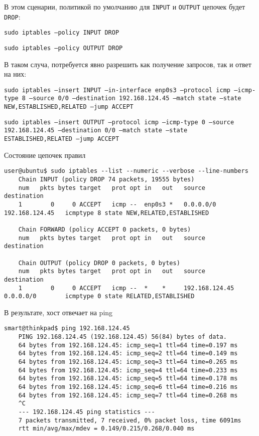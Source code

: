 В этом сценарии, политикой по умолчанию для \texttt{INPUT} и \texttt{OUTPUT} цепочек будет \texttt{DROP}:

\texttt{sudo iptables --policy INPUT DROP}

\texttt{sudo iptables --policy OUTPUT DROP}

В таком случа, потребуется явно разрешить как получение запросов, так и ответ на них:

\texttt{sudo iptables --insert INPUT --in-interface enp0s3 --protocol icmp --icmp-type 8 --source 0/0 --destination 192.168.124.45 --match state --state NEW,ESTABLISHED,RELATED --jump ACCEPT}

\texttt{sudo iptables --insert OUTPUT --protocol icmp --icmp-type 0 --source 192.168.124.45 --destination 0/0 --match state --state ESTABLISHED,RELATED --jump ACCEPT}

Состояние цепочек правил
\begin{Verbatim}[frame=single]
    user@ubuntu$ sudo iptables --list --numeric --verbose --line-numbers
    Chain INPUT (policy DROP 74 packets, 19555 bytes)
    num   pkts bytes target   prot opt in   out   source           destination
    1        0     0 ACCEPT   icmp --  enp0s3 *   0.0.0.0/0        192.168.124.45   icmptype 8 state NEW,RELATED,ESTABLISHED
    
    Chain FORWARD (policy ACCEPT 0 packets, 0 bytes)
    num   pkts bytes target   prot opt in   out   source           destination
    
    Chain OUTPUT (policy DROP 0 packets, 0 bytes)
    num   pkts bytes target   prot opt in   out   source           destination
    1        0     0 ACCEPT   icmp --  *    *     192.168.124.45   0.0.0.0/0        icmptype 0 state RELATED,ESTABLISHED
\end{Verbatim}

В результате, хост отвечает на ping
\begin{Verbatim}[frame=single]
    smart@thinkpad$ ping 192.168.124.45
    PING 192.168.124.45 (192.168.124.45) 56(84) bytes of data.
    64 bytes from 192.168.124.45: icmp_seq=1 ttl=64 time=0.197 ms
    64 bytes from 192.168.124.45: icmp_seq=2 ttl=64 time=0.149 ms
    64 bytes from 192.168.124.45: icmp_seq=3 ttl=64 time=0.265 ms
    64 bytes from 192.168.124.45: icmp_seq=4 ttl=64 time=0.233 ms
    64 bytes from 192.168.124.45: icmp_seq=5 ttl=64 time=0.178 ms
    64 bytes from 192.168.124.45: icmp_seq=6 ttl=64 time=0.216 ms
    64 bytes from 192.168.124.45: icmp_seq=7 ttl=64 time=0.268 ms
    ^C
    --- 192.168.124.45 ping statistics ---
    7 packets transmitted, 7 received, 0% packet loss, time 6091ms
    rtt min/avg/max/mdev = 0.149/0.215/0.268/0.040 ms
\end{Verbatim}

